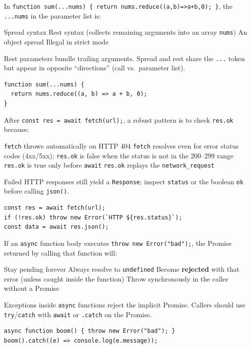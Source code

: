 \newpage
\question[4]
In \texttt{function sum(...nums) \{ return nums.reduce((a,b)=>a+b,0); \}}, the \texttt{...nums} in the parameter list is:
\begin{choices}
  \choice Spread syntax
  \CorrectChoice Rest syntax (collects remaining arguments into an array \texttt{nums})
  \choice An object spread
  \choice Illegal in strict mode
\end{choices}
\begin{solution}
  Rest parameters bundle trailing arguments. Spread and rest share the \texttt{...} token but appear in opposite ``directions'' (call vs.\ parameter list).
\begin{lstlisting}[style=jsexam]
function sum(...nums) {
  return nums.reduce((a, b) => a + b, 0);
}
\end{lstlisting}
\end{solution}

\question[4]
After \texttt{const res = await fetch(url);}, a robust pattern is to check \texttt{res.ok} because:
\begin{choices}
  \choice \texttt{fetch} throws automatically on HTTP 404
  \CorrectChoice \texttt{fetch} resolves even for error status codes (4xx/5xx); \texttt{res.ok} is false when the status is not in the 200--299 range
  \choice \texttt{res.ok} is true only before \texttt{await}
  \choice \texttt{res.ok} replays the \texttt{network\_request}
\end{choices}
\begin{solution}
  Failed HTTP responses still yield a \texttt{Response}; inspect \texttt{status} or the boolean \texttt{ok} before calling \texttt{json()}.
\begin{lstlisting}[style=jsexam]
const res = await fetch(url);
if (!res.ok) throw new Error(`HTTP ${res.status}`);
const data = await res.json();
\end{lstlisting}
\end{solution}

\question[4]
If an \texttt{async} function body executes \texttt{throw new Error("bad");}, the Promise returned by calling that function will:
\begin{choices}
  \choice Stay pending forever
  \choice Always resolve to \texttt{undefined}
  \CorrectChoice Become \textbf{rejected} with that error (unless caught inside the function)
  \choice Throw synchronously in the caller without a Promise
\end{choices}
\begin{solution}
  Exceptions inside \texttt{async} functions reject the implicit Promise. Callers should use \texttt{try}/\texttt{catch} with \texttt{await} or \texttt{.catch} on the Promise.
\begin{lstlisting}[style=jsexam]
async function boom() { throw new Error("bad"); }
boom().catch((e) => console.log(e.message));
\end{lstlisting}
\end{solution}

